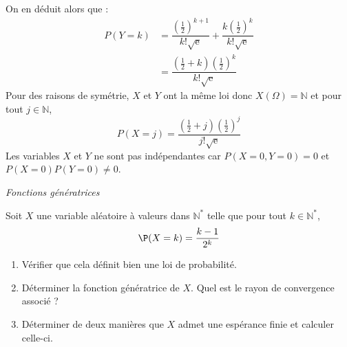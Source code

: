 \documentclass[a4paper,10pt]{report}
\begin{document}
On en déduit alors que :
\begin{align*}
P(Y=k) & =\dfrac{\left(\tfrac{1}{2} \right)^{k+1}}{k!\sqrt{\mathrm{e}}}+\dfrac{k\left(\tfrac{1}{2} \right)^{k}}{k!\sqrt{\mathrm{e}}} \\
&= \dfrac{(\tfrac{1}{2}+k)\left(\tfrac{1}{2} \right)^{k}}{k!\sqrt{\mathrm{e}}}
\end{align*}
Pour des raisons de symétrie, $X$ et $Y$ ont la même loi donc $X(\Omega)=\mathbb{N}$ et pour tout $ j \in {\mathbb{N}}$, 
$$P(X=j)=\dfrac{(\tfrac{1}{2}+j)\left(\tfrac{1}{2} \right)^{j}}{j!\sqrt{\mathrm{e}}}$$
Les variables $X$ et $Y$ ne sont pas indépendantes car $P(X=0,Y=0)=0$ et $P(X=0)P(Y=0)\neq 0$.

\medskip

\begin{center}
\textit{{ {\large Fonctions génératrices}}}
\end{center}

\medskip

\begin{Exa}  Soit $X$ une variable aléatoire à valeurs dans $\mathbb{N}^*$ telle que pour tout $k \in \mathbb{N}^*$,
$$ \P(X=k) = \dfrac{k-1}{2^k}$$

\begin{enumerate}
\item Vérifier que cela définit bien une loi de probabilité.
\item Déterminer la fonction génératrice de $X$. Quel est le rayon de convergence associé ?
\item Déterminer de deux manières que $X$ admet une espérance finie et calculer celle-ci.
\end{enumerate}
\end{Exa}

\corr 
\end{document}
